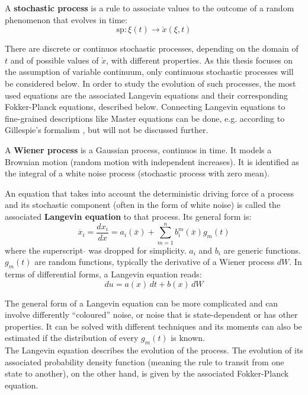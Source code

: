 \begin{definition}
	A \textbf{stochastic process} is a rule to associate values to the outcome of a random phenomenon that evolves in time:
	\begin{equation}
		\text{sp}: \xi(t) \rightarrow \check{x}(\xi, t)
	\end{equation}
\end{definition}
There are discrete or continuos stochastic processes, depending on the domain of $t$ and of possible values of $\check{x}$, with different properties. As this thesis focuses on the assumption of variable continuum, only continuous stochastic processes will be considered below. In order to study the evolution of such processes, the most used equations are the associated Langevin equations and their corresponding Fokker-Planck equations, described below. Connecting Langevin equations to fine-grained descriptions like Master equations can be done, e.g. according to Gillespie's formalism \citep{Gillespie2000}, but will not be discussed further.

\begin{definition}
	A \textbf{Wiener process} is a Gaussian process, continuos in time. It models a Brownian motion (random motion with independent increases). It is identified as the integral of a white noise process (stochastic process with zero mean).
\end{definition}

\begin{definition}
	An equation that takes into account the deterministic driving force of a process and its stochastic component (often in the form of white noise) is called the associated \textbf{Langevin equation} to that process. Its general form is:
	\begin{equation}
		\dot{x_i} = \frac{dx_i}{dx} = a_i(\bar{x}) + \sum_{m=1}^{n}b^m_i(\bar{x})g_m(t)
	\end{equation}
	where the superscript $\check{}$ was dropped for simplicity. $a_i$ and $b_i$ are generic functions. $g_m(t)$ are random functions, typically the derivative of a Wiener process $dW$. In terms of differential forms, a Langevin equation reads:
	\begin{equation}
		du  = a(x) \, dt + b(x) \, dW
		\label{eq:langevin_eq}
	\end{equation}
\end{definition}

The general form of a Langevin equation can be more complicated and can involve differently ``coloured'' noise, or noise that is state-dependent or has other properties. It can be solved with different techniques and its moments can also be estimated if the distribution of every $g_m(t)$ is known.\\
The Langevin equation describes the evolution of the process. The evolution of its associated probability density function (meaning the rule to transit from one state to another), on the other hand, is given by the associated Fokker-Planck equation.

